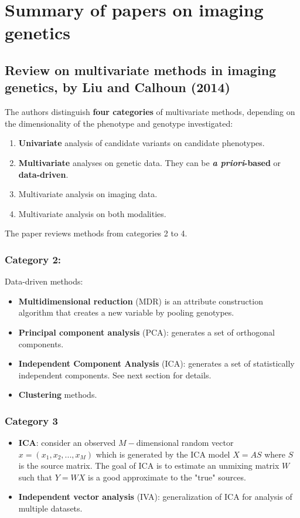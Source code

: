 \documentclass[9pt]{article}
\begin{document}
\section{Summary of papers on imaging genetics}

\subsection{Review on multivariate methods in imaging genetics, by Liu and Calhoun (2014)}

The authors distinguish \textbf{four categories} of multivariate methods, depending on the dimensionality of the phenotype and genotype investigated:
\begin{enumerate}
  \item \textbf{Univariate} analysis of candidate variants on candidate phenotypes.
  \item \textbf{Multivariate} analyses on genetic data. They can be \textbf{\emph{a priori}-based} or \textbf{data-driven}.
  \item Multivariate analysis on imaging data.
  \item Multivariate analysis on both modalities.
\end{enumerate}

The paper reviews methods from categories 2 to 4.

\subsubsection{Category 2:}
Data-driven methods:
\begin{itemize}
\item\textbf{Multidimensional reduction} (MDR) is an attribute construction algorithm that creates a new variable by pooling genotypes.
\item \textbf{Principal component analysis} (PCA):  generates a set of orthogonal components.
\item \textbf{Independent Component Analysis} (ICA): generates a set of statistically independent components. See next section for details.
\item \textbf{Clustering} methods.
\end{itemize}

\subsubsection{Category 3}
\begin{itemize}
\item\textbf{ICA}: consider an observed $M-$dimensional random vector $x=(x_1, x_2, ..., x_M)$ which is generated by the ICA model $X=AS$ where $S$ is the source matrix. The goal of ICA is to estimate an unmixing matrix $W$ such that $Y=WX$ is a good approximate to the "true" sources.
\item\textbf{Independent vector analysis} (IVA): generalization of ICA for analysis of multiple datasets.
\end{itemize}
\end{document}
